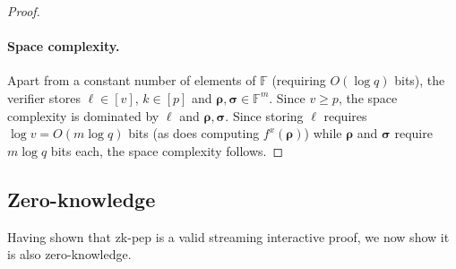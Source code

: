 \documentclass[a4paper,UKenglish,cleveref, autoref, thm-restate]{lipics-v2021}
\theoremstyle{definition}
\newcommand{\field}{\mathbb{F}}
\newcommand{\vcommitlength}{v}
\newcommand{\pcommitlength}{p}
\newcommand{\dimension}{m}
\newcommand{\fieldsize}{q}
\newcommand{\fingerprinttuple}{\bm{\rho}}
\newcommand{\Fingerprinttuple}{\bm{\sigma}}
\begin{document}
\begin{proof}
    \paragraph*{Space complexity\iflipics\else.\fi} Apart from a constant number of elements of $\field$ (requiring $O(\log \fieldsize)$ bits), the verifier stores $\ell \in [\vcommitlength]$, $k \in [\pcommitlength]$ and $\fingerprinttuple, \Fingerprinttuple \in \field^\dimension$. Since $\vcommitlength \geq \pcommitlength$, the space complexity is dominated by $\ell$ and $\fingerprinttuple, \Fingerprinttuple$. Since storing $\ell$ requires $\log \vcommitlength = O(\dimension \log \fieldsize)$ bits (as does computing $f^x(\fingerprinttuple)$) while $\fingerprinttuple$ and $\Fingerprinttuple$ require $\dimension \log \fieldsize$ bits each, the space complexity follows.
\end{proof}

\subsection{Zero-knowledge}

Having shown that \textsf{zk-pep} is a valid streaming interactive proof, we now show it is also zero-knowledge.
\end{document}
